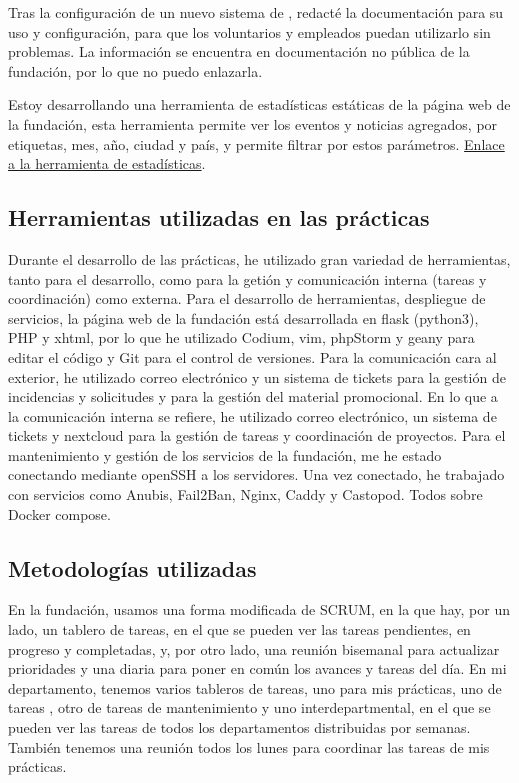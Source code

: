     Tras la configuración de un nuevo sistema de , redacté la documentación para su uso y configuración, para que los voluntarios y empleados puedan utilizarlo sin problemas.
    La información se encuentra en documentación no pública de la fundación, por lo que no puedo enlazarla.

    Estoy desarrollando una herramienta de estadísticas estáticas de la página web de la fundación,
    esta herramienta permite ver los eventos y noticias agregados, por etiquetas, mes, año, ciudad y país, y permite filtrar por estos parámetros.
    \href{https://git.fsfe.org/marcelo.fm/get_stats}{Enlace a la herramienta de estadísticas}.

\subsection{Herramientas utilizadas en las prácticas}\label{subsec:herramientas}
    Durante el desarrollo de las prácticas, he utilizado gran variedad de herramientas, tanto para el desarrollo, como para la getión y comunicación interna (tareas y coordinación) como externa.
    Para el desarrollo de herramientas, despliegue de servicios, la página web de la fundación está desarrollada en flask (python3), PHP y xhtml, por lo que he utilizado Codium, vim, phpStorm y geany para editar el código y Git para el control de versiones.
    Para la comunicación cara al exterior, he utilizado correo electrónico y un sistema de tickets para la gestión de incidencias y solicitudes y para la gestión del material promocional.
    En lo que a la comunicación interna se refiere, he utilizado correo electrónico, un sistema de tickets y nextcloud para la gestión de tareas y coordinación de proyectos.
    Para el mantenimiento y gestión de los servicios de la fundación, me he estado conectando mediante openSSH a los servidores.
    Una vez conectado, he trabajado con servicios como Anubis, Fail2Ban, Nginx, Caddy y Castopod.
    Todos sobre Docker compose.

\subsection{Metodologías utilizadas}\label{subsec:metodologias}
    En la fundación, usamos una forma modificada de SCRUM, en la que hay, por un lado, un tablero de tareas, en el que se pueden ver las tareas pendientes, en progreso y completadas, y, por otro lado,
    una reunión bisemanal para actualizar prioridades y una diaria para poner en común los avances y tareas del día.
    En mi departamento, tenemos varios tableros de tareas, uno para mis prácticas, uno de tareas ,
    otro de tareas de mantenimiento y uno interdepartmental, en el que se pueden ver las tareas de todos los departamentos distribuidas por semanas.
    También tenemos una reunión todos los lunes para coordinar las tareas de mis prácticas.

